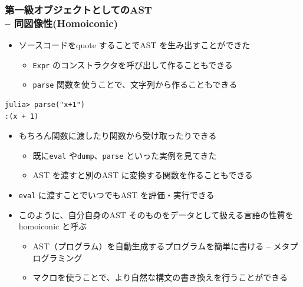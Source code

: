 \begin{frame}[containsverbatim]
\frametitle{第一級オブジェクトとしてのAST \\ -- 同図像性(Homoiconic)}
\begin{itemize}
  \item ソースコードをquote することでAST を生み出すことができた
    \begin{itemize}
      \item \verb|Expr| のコンストラクタを呼び出して作ることもできる
      \item \verb|parse| 関数を使うことで、文字列から作ることもできる
    \end{itemize}
\end{itemize}
\begin{lstlisting}
julia> parse("x+1")
:(x + 1)
\end{lstlisting}
\begin{itemize}
  \item もちろん関数に渡したり関数から受け取ったりできる
  \begin{itemize}
    \item 既に\verb|eval| や\verb|dump|、\verb|parse| といった実例を見てきた
    \item AST を渡すと別のAST に変換する関数を作ることもできる
  \end{itemize}
  \item \verb|eval| に渡すことでいつでもAST を評価・実行できる
  \item このように、自分自身のAST そのものをデータとして扱える言語の性質をhomoiconic と呼ぶ
    \begin{itemize}
      \item AST（プログラム）を自動生成するプログラムを簡単に書ける -- メタプログラミング
      \item マクロを使うことで、より自然な構文の書き換えを行うことができる
    \end{itemize}
\end{itemize}
\end{frame}

